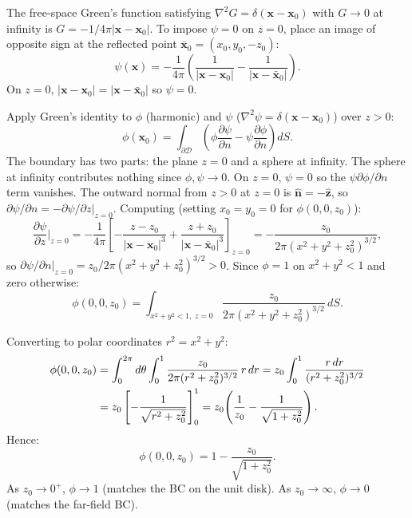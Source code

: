 The free-space Green's function
satisfying $\nabla^2 G = \delta(\mathbf{x}-\mathbf{x}_0)$ with $G\to 0$
at infinity is $G = -1/4\pi|\mathbf{x}-\mathbf{x}_0|$. To impose $\psi=0$
on $z=0$, place an image of opposite sign at the reflected point
$\bar{\mathbf{x}}_0 = (x_0,y_0,-z_0)$:
\begin{equation}
  \psi(\mathbf{x}) = -\frac{1}{4\pi}\!\left(
    \frac{1}{|\mathbf{x}-\mathbf{x}_0|}
    - \frac{1}{|\mathbf{x}-\bar{\mathbf{x}}_0|}
  \right).
\end{equation}
On $z=0$, $|\mathbf{x}-\mathbf{x}_0|=|\mathbf{x}-\bar{\mathbf{x}}_0|$
so $\psi=0$. 

Apply Green's
identity to $\phi$ (harmonic) and $\psi$ ($\nabla^2\psi =
\delta(\mathbf{x}-\mathbf{x}_0)$) over $z>0$:
\begin{equation}
  \phi(\mathbf{x}_0) = \int_{\partial\mathcal{D}}
  \!\left(\phi\frac{\partial\psi}{\partial n}
  - \psi\frac{\partial\phi}{\partial n}\right)dS.
\end{equation}
The boundary has two parts: the plane $z=0$ and a sphere at infinity.
The sphere at infinity contributes nothing since $\phi,\psi\to 0$. On
$z=0$, $\psi=0$ so the $\psi\partial\phi/\partial n$ term vanishes. The outward
normal from $z>0$ at $z=0$ is $\hat{\mathbf{n}}=-\hat{\mathbf{z}}$, so
$\partial\psi/\partial n = -\partial\psi/\partial z\big|_{z=0}$. Computing (setting
$x_0=y_0=0$ for $\phi(0,0,z_0)$):
\begin{equation}
  \frac{\partial\psi}{\partial z}\bigg|_{z=0}
  = -\frac{1}{4\pi}\!\left[
    -\frac{z-z_0}{|\mathbf{x}-\mathbf{x}_0|^3}
    +\frac{z+z_0}{|\mathbf{x}-\bar{\mathbf{x}}_0|^3}
  \right]_{z=0}
  = -\frac{z_0}{2\pi(x^2+y^2+z_0^2)^{3/2}},
\end{equation}
so $\partial\psi/\partial n\big|_{z=0} = z_0/2\pi(x^2+y^2+z_0^2)^{3/2} > 0$.
Since $\phi=1$ on $x^2+y^2<1$ and zero otherwise:
\begin{equation}
  \phi(0,0,z_0) = \int_{x^2+y^2<1,\;z=0}
  \frac{z_0}{2\pi(x^2+y^2+z_0^2)^{3/2}}\,dS.
\end{equation}

Converting to polar coordinates
$r^2=x^2+y^2$:
\begin{align}
  \phi(0,0,z_0)
  &= \int_0^{2\pi}d\theta\int_0^1
    \frac{z_0}{2\pi(r^2+z_0^2)^{3/2}}\,r\,dr
   = z_0\int_0^1\frac{r\,dr}{(r^2+z_0^2)^{3/2}} \notag\\
  &= z_0\left[-\frac{1}{\sqrt{r^2+z_0^2}}\right]_0^1
   = z_0\!\left(\frac{1}{z_0}-\frac{1}{\sqrt{1+z_0^2}}\right).
\end{align}
Hence:
\begin{equation}
  \boxed{\phi(0,0,z_0) = 1 - \frac{z_0}{\sqrt{1+z_0^2}}.}
\end{equation}
As $z_0\to 0^+$, $\phi\to 1$ (matches the BC on the unit disk). As
$z_0\to\infty$, $\phi\to 0$ (matches the far-field BC). 

